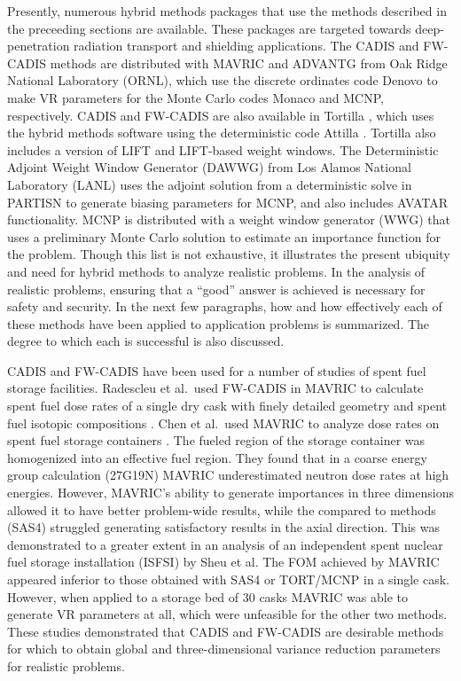 Presently, numerous hybrid methods packages that use the methods described in
the preceeding sections are available. These packages are targeted towards
deep-penetration radiation transport and shielding applications.
The CADIS and FW-CADIS methods are distributed with MAVRIC \cite{SCALE6_1,
peplow_advanced_2007} and
ADVANTG \cite{mosher_automated_2009} from Oak Ridge National Laboratory (ORNL),
which
use the discrete ordinates code Denovo \cite{evans_denovo:_2010} to make VR
parameters for the Monte Carlo codes
Monaco \cite{SCALE6_1} and MCNP\cite{mcnp_manual_v1},
respectively. CADIS and FW-CADIS are also available in Tortilla
\cite{somasundaram_implementation_2013},
which uses the hybrid methods software using the deterministic code Attilla
\cite{lucas_applications_2004}. Tortilla also includes a version of LIFT and
LIFT-based weight windows. The Deterministic Adjoint Weight Window
Generator (DAWWG) from Los Alamos National Laboratory (LANL)
\cite{sweezy_automated_2005} uses the adjoint solution
from a deterministic solve in
PARTISN \cite{alcouffe_partisn_2002}
to generate biasing parameters for MCNP, and also includes AVATAR
functionality. MCNP \cite{mcnp_manual_v1} is distributed with a weight window
generator (WWG) that uses a preliminary Monte Carlo solution to estimate an
importance function for the problem. Though this list is not exhaustive, it
illustrates the present ubiquity and need for hybrid methods to analyze
realistic problems. In the analysis of realistic problems, ensuring that a
``good'' answer is achieved is necessary for safety and security. In the next
few paragraphs, how and how effectively each of these methods have been
applied to application problems
is summarized.
The degree to which each is successful is also discussed.

CADIS and FW-CADIS have been used for a number of studies of spent fuel storage
facilities.
Radescleu et al.\ used FW-CADIS in MAVRIC to calculate spent fuel
dose rates of a single dry cask
with finely detailed geometry and spent fuel isotopic compositions
\cite{radulescu_dose_2013}.
Chen et al.\ used MAVRIC \cite{SCALE6_1} to analyze dose rates on spent fuel
storage containers \cite{chen_surface_2011}. The fueled region of the storage
container was homogenized into an effective fuel region.
They found that in a coarse energy
group calculation (27G19N) MAVRIC underestimated neutron dose rates at high
energies. However, MAVRIC's ability to generate importances in three dimensions
allowed it to have better problem-wide results, while the compared to methods
(SAS4) struggled generating satisfactory results in the axial direction. This
was demonstrated to a greater extent in an analysis of an independent spent
nuclear fuel storage installation (ISFSI) \cite{sheu_dose_2011} by Sheu et al.
The FOM
achieved by MAVRIC appeared inferior to those obtained with SAS4 or TORT/MCNP in
a single cask. However, when applied to a storage bed of 30 casks MAVRIC was able to
generate VR parameters at all, which were unfeasible for the other two methods. These
studies demonstrated that CADIS and FW-CADIS are desirable methods for which to
obtain global and three-dimensional variance reduction parameters for realistic
problems.

